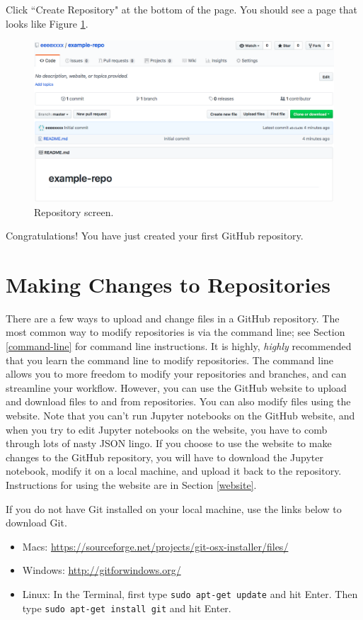 \documentclass[11pt,a4paper]{article}
\begin{document}
Click ``Create Repository" at the bottom of the page.
You should see a page that looks like Figure \ref{fig:repo-screen}.

\begin{figure}[h!]
\centering
\includegraphics[width=.7\textwidth]{figures/repo_screen.png}
\caption{Repository screen.}
\label{fig:repo-screen}
\end{figure}

Congratulations!
You have just created your first GitHub repository.

\section{Making Changes to Repositories}
There are a few ways to upload and change files in a GitHub repository.
The most common way to modify repositories is via the command line; see Section \ref{command-line} for command line instructions.
It is highly, \textit{highly} recommended that you learn the command line to modify repositories.
The command line allows you to more freedom to modify your repositories and branches, and can streamline your workflow.
However, you can use the GitHub website to upload and download files to and from repositories.
You can also modify files using the website.
Note that you can't run Jupyter notebooks on the GitHub website, and when you try to edit Jupyter notebooks on the website, you have to comb through lots of nasty JSON lingo.
If you choose to use the website to make changes to the GitHub repository, you will have to download the Jupyter notebook, modify it on a local machine, and upload it back to the repository.
Instructions for using the website are in Section \ref{website}.

If you do not have Git installed on your local machine, use the links below to download Git.
\begin{itemize}
\item[] Macs: \url{https://sourceforge.net/projects/git-osx-installer/files/}
\item[] Windows: \url{http://gitforwindows.org/}
\item[] Linux: In the Terminal, first type \texttt{sudo apt-get update} and hit Enter. Then type \texttt{sudo apt-get install git} and hit Enter.
\end{itemize} 
\end{document}
